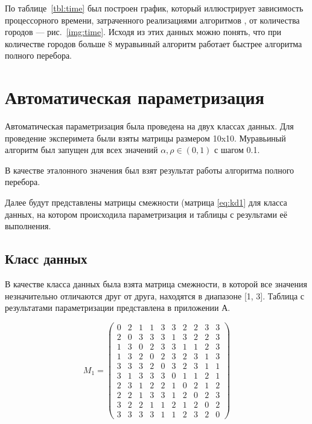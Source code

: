 По таблице~\ref{tbl:time} был построен график, который иллюстрирует зависимость процессорного времени, затраченного реализациями алгоритмов , от количества городов --- рис.~\ref{img:time}.
Исходя из этих данных можно понять, что при количестве городов больше 8 муравьиный алгоритм работает быстрее алгоритма полного перебора.

\clearpage

\section{Автоматическая параметризация}

Автоматическая параметризация была проведена на двух классах данных.
Для проведение эксперимета были взяты матрицы размером 10x10.
Муравьиный алгоритм был запущен для всех значений $\alpha, \rho \in (0, 1)$ с шагом 0.1.

В качестве эталонного значения был взят результат работы алгоритма полного перебора. 

Далее будут представлены матрицы смежности (матрица \ref{eq:kd1} для класса данных, на котором происходила параметризация и таблицы с результами её выполнения.

\subsection{Класс данных}

В качестве класса данных была взята матрица смежности, в которой все значения незначительно отличаются друг от друга, находятся в диапазоне [1, 3].
Таблица с результатами параметризации представлена в приложении А.

\begin{equation}
    \label{eq:kd1}
	M_{1} = \begin{pmatrix}
		0 & 2 & 1 & 1 & 3 & 3 & 2 & 2 & 3 & 3 \\
		2 & 0 & 3 & 3 & 3 & 1 & 3 & 2 & 2 & 3 \\
		1 & 3 & 0 & 2 & 3 & 3 & 1 & 1 & 2 & 3 \\
		1 & 3 & 2 & 0 & 2 & 3 & 2 & 3 & 1 & 3 \\
		3 & 3 & 3 & 2 & 0 & 3 & 2 & 3 & 1 & 1 \\
		3 & 1 & 3 & 3 & 3 & 0 & 1 & 1 & 2 & 1 \\
		2 & 3 & 1 & 2 & 2 & 1 & 0 & 2 & 1 & 2 \\
		2 & 2 & 1 & 3 & 3 & 1 & 2 & 0 & 2 & 3 \\
		3 & 2 & 2 & 1 & 1 & 2 & 1 & 2 & 0 & 2 \\
		3 & 3 & 3 & 3 & 1 & 1 & 2 & 3 & 2 & 0 
	\end{pmatrix}
\end{equation}

